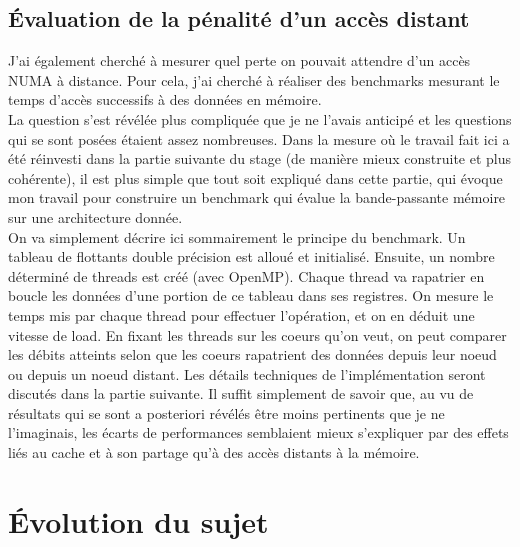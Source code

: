 \documentclass{report}
\begin{document}
\subsection{Évaluation de la pénalité d'un accès distant}
J'ai également cherché à mesurer quel perte on pouvait attendre d'un accès NUMA à distance. Pour cela, j'ai
cherché à réaliser des benchmarks mesurant le temps d'accès successifs à des données en mémoire.
\\La question s'est révélée plus compliquée que je ne l'avais anticipé et les questions qui se sont posées
étaient assez nombreuses. Dans la mesure où le travail fait ici a été réinvesti dans la partie suivante du
stage (de manière mieux construite et plus cohérente), il est plus simple que tout soit expliqué dans 
cette partie, qui évoque mon travail pour construire un benchmark qui évalue la bande-passante mémoire
sur une architecture donnée. 
\\On va simplement décrire ici sommairement le principe du benchmark. Un tableau de flottants double précision
est alloué et initialisé. Ensuite, un nombre déterminé de threads est créé (avec OpenMP). Chaque thread va 
rapatrier en boucle les données d'une portion de ce tableau dans ses registres. On mesure le temps mis par
chaque thread pour effectuer l'opération, et on en déduit une vitesse de load. En fixant les threads sur les
coeurs qu'on veut, on peut comparer les débits atteints selon que les coeurs rapatrient des données depuis leur
noeud ou depuis un noeud distant. Les détails techniques de l'implémentation seront discutés dans la partie 
suivante. Il suffit simplement de savoir que, au vu de résultats qui se sont a posteriori révélés être moins 
pertinents que je ne l'imaginais, les écarts de performances semblaient mieux s'expliquer par des effets
liés au cache et à son partage qu'à des accès distants à la mémoire.
\section{Évolution du sujet}
\end{document}
